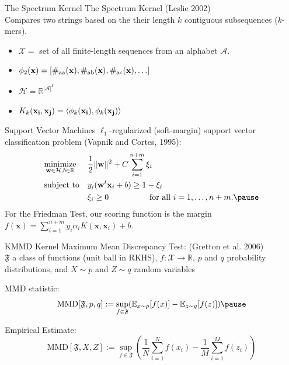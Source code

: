 \documentclass{beamer}
\providecommand{\norm}[1]{\lVert#1\rVert}
\begin{document}
\begin{frame}{The Spectrum Kernel}
  The Spectrum Kernel (Leslie 2002) \\ \pause
  Compares two strings based on the their length $k$ contiguous
  subsequences ($k$-mers). \pause
  \begin{itemize}
    \item $\mathcal{X} = $ set of all finite-length sequences from an alphabet $\mathcal{A}$. \pause
    \item $\phi_2({\bf x}) = [\#_{\text{aa}}({\bf x}), \#_{\text{ab}}({\bf x}), \#_{\text{ac}}({\bf x}), \ldots ]$ \pause
    \item $\mathcal{H} = \mathbb{R}^{|\mathcal{A}|^k}$ \pause
    \item $K_k({\bf x_i}, {\bf x_j}) = \langle \phi_k({\bf x_i}), \phi_k({\bf x_j}) \rangle$
  \end{itemize}
\end{frame}

\begin{frame}{Support Vector Machines}
$\ell_1$-regularized (soft-margin) support vector classification problem
(Vapnik and Cortes, 1995): \pause
\begin{equation*}
\begin{aligned}
& \underset{\mathbf{w} \in \mathcal{H}, b \in \mathbb{R}}{\text{minimize}}
& &\frac{1}{2}\norm{\mathbf{w}}^2+C\sum_{i=1}^{n+m} \xi_i \\
& \text{subject to}
& & y_i(\mathbf{w}^t \mathbf{x}_i + b) \geq 1 - \xi_i \\
&&& \xi_i \geq 0 \qquad \qquad \quad \text{for all } i=1,\ldots,n+m. \pause
\end{aligned}
\end{equation*}
For the Friedman Test, our scoring function is the margin
$f(\mathbf{x}) = \sum_{i=1}^{n+m} y_i \alpha_i K(\mathbf{x}, \mathbf{x}_i) + b$.
\end{frame}

\begin{frame}{KMMD}
  Kernel Maximum Mean Discrepancy Test: (Gretton et al. 2006) \\ \pause
  $\mathfrak{F}$ a class of functions (unit ball in RKHS), $f:\mathcal{X} \to \mathbb{R}$,
  $p$ and $q$ probability distributions, and $X \sim p$ and $Z \sim q$ random variables \\ \pause

  MMD statistic:
  \begin{equation*}
    \text{MMD}[\mathfrak{F},p,q] := \sup_{f\in
      \mathfrak{F}}(\mathbb{E}_{x\sim p}[f(x)] - \mathbb{E}_{z\sim q}[f(z)]) \pause
  \end{equation*}

  Empirical Estimate:
  \begin{equation*}
    \text{MMD}[\mathfrak{F},X,Z] := \sup_{f\in
      \mathfrak{F}}\left (\frac{1}{N}\sum_{i=1}^Nf(x_i) -
    \frac{1}{M}\sum_{i=1}^M f(z_i) \right )
  \end{equation*}
\end{frame}
\end{document}
